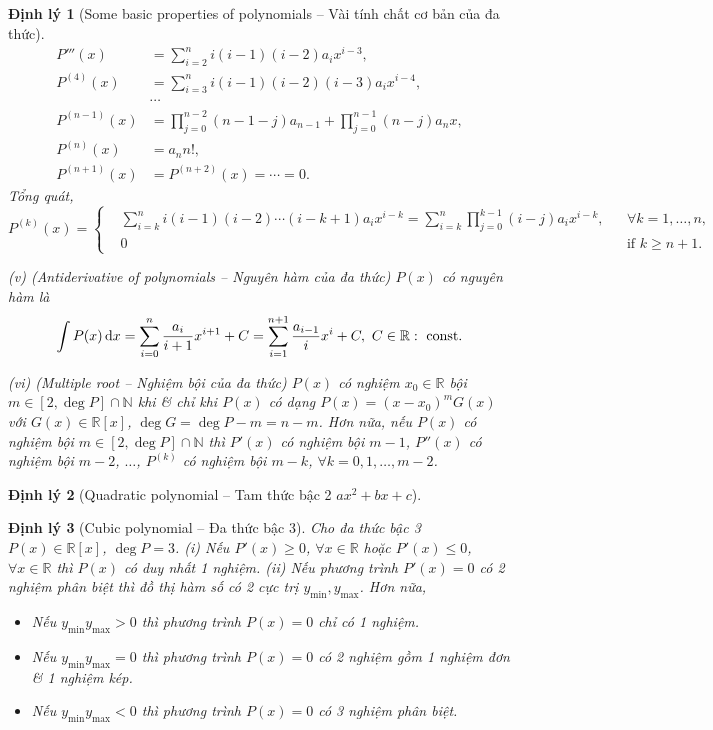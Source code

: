 \documentclass{article}
\newtheorem{dinhly}{Định lý}
\begin{document}
\begin{dinhly}[Some basic properties of polynomials -- Vài tính chất cơ bản của đa thức]
\begin{align*}
		P'''(x) &= \sum_{i=2}^n i(i - 1)(i - 2)a_ix^{i-3},\\
		P^{(4)}(x) &= \sum_{i=3}^n i(i - 1)(i - 2)(i - 3)a_ix^{i-4},\\
		&\cdots\\
		P^{(n - 1)}(x) &= \prod_{j=0}^{n-2} (n - 1 - j)a_{n-1} + \prod_{j=0}^{n - 1} (n - j)a_nx,\\
		P^{(n)}(x) &= a_nn!,\\
		P^{(n + 1)}(x) &= P^{(n + 2)}(x) = \cdots = 0.
	\end{align*}
	Tổng quát,
	\begin{equation*}
		P^{(k)}(x) = \left\{\begin{split}
			&\sum_{i=k}^n i(i - 1)(i - 2)\cdots(i - k + 1)a_ix^{i - k} = \sum_{i=k}^n\prod_{j=0}^{k-1} (i - j)a_ix^{i - k},&&\forall k = 1,\ldots,n,\\
			&0&&\mbox{if } k\ge n + 1.
		\end{split}\right.
	\end{equation*}
	\item(v) {\rm(Antiderivative of polynomials -- Nguyên hàm của đa thức)} $P(x)$ có nguyên hàm là
	\begin{equation*}
		\int P(x)\,{\rm d}x = \sum_{i=0}^n \frac{a_i}{i + 1}x^{i + 1} + C = \sum_{i=1}^{n + 1} \frac{a_{i-1}}{i}x^i + C,\ C\in\mathbb{R}:\mbox{ const}.
	\end{equation*}	
	\item(vi) {\rm(Multiple root -- Nghiệm bội của đa thức)} $P(x)$ có nghiệm $x_0\in\mathbb{R}$ bội $m\in[2,\deg P]\cap\mathbb{N}$ khi \& chỉ khi $P(x)$ có dạng $P(x) = (x - x_0)^mG(x)$ với $G(x)\in\mathbb{R}[x]$, $\deg G = \deg P - m = n - m$. Hơn nữa, nếu $P(x)$ có nghiệm bội $m\in[2,\deg P]\cap\mathbb{N}$ thì $P'(x)$ có nghiệm bội $m - 1$, $P''(x)$ có nghiệm bội $m - 2$, $\ldots$, $P^{(k)}$ có nghiệm bội $m - k$, $\forall k = 0,1,\ldots,m - 2$.
\end{dinhly}

\begin{dinhly}[Quadratic polynomial -- Tam thức bậc 2 $ax^2 + bx + c$]
	
\end{dinhly}

\begin{dinhly}[Cubic polynomial -- Đa thức bậc 3]
	Cho đa thức bậc 3 $P(x)\in\mathbb{R}[x]$, $\deg P = 3$. (i) Nếu $P'(x)\ge0$, $\forall x\in\mathbb{R}$ hoặc $P'(x)\le0$, $\forall x\in\mathbb{R}$ thì $P(x)$ có duy nhất 1 nghiệm. (ii) Nếu phương trình $P'(x) = 0$ có 2 nghiệm phân biệt thì đồ thị hàm số có 2 cực trị $y_{\min},y_{\max}$. Hơn nữa,
	\begin{itemize}
		\item Nếu $y_{\min}y_{\max} > 0$ thì phương trình $P(x) = 0 $ chỉ có 1 nghiệm.
		\item Nếu $y_{\min}y_{\max} = 0$ thì phương trình $P(x) = 0 $ có 2 nghiệm gồm 1 nghiệm đơn \& 1 nghiệm kép.
		\item Nếu $y_{\min}y_{\max} < 0$ thì phương trình $P(x) = 0 $ có 3 nghiệm phân biệt.
	\end{itemize}
\end{dinhly}
\end{document}
